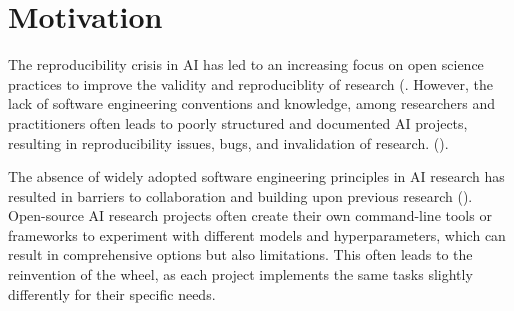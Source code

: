 
\section{Motivation}


The reproducibility crisis in AI has led to an increasing focus on open science practices to improve the validity and reproduciblity of research (\cite{coro2020open,braun2018open,hicks2021open,paton2019open,kocak2022transparency,stodden-towardreprodicibleresearch}. However, the lack of software engineering conventions and knowledge, among researchers and practitioners often leads to poorly structured and documented AI projects, resulting in reproducibility issues, bugs, and invalidation of research. (\cite{leakage-recrisis,epskamp2019reproducibilitybug, seAIsurvey, martinez2022softwareAI,mainatiblity}).
 

The absence of widely adopted software engineering principles in AI research has resulted in barriers to collaboration and building upon previous research (\cite{accountabilityInAi}). Open-source AI research projects often create their own command-line tools or frameworks to experiment with different models and hyperparameters, which can result in comprehensive options but also limitations. This often leads to the reinvention of the wheel, as each project implements the same tasks slightly differently for their specific needs.


